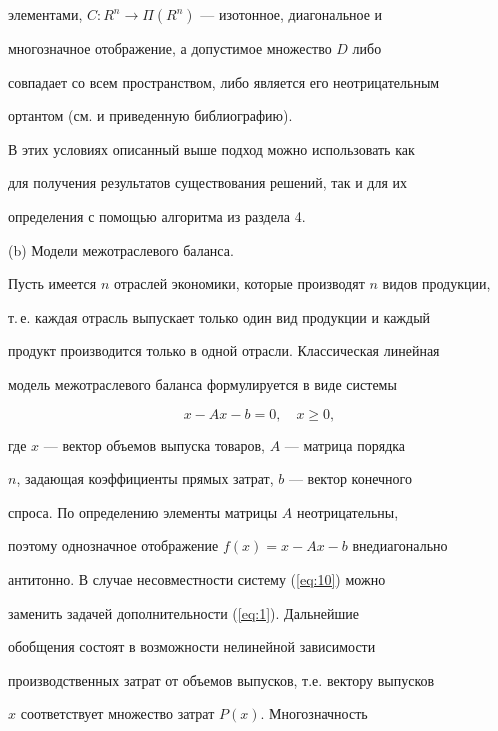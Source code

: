 элементами, $C: R^n \to \Pi (R^n)$ --- изотонное, диагональное и


многозначное отображение, а допустимое множество $D$ либо


совпадает со всем пространством, либо является его неотрицательным


ортантом (см. \cite{Lap99} и приведенную библиографию). 


В этих условиях описанный выше подход можно использовать как


для получения результатов существования решений, так и для их


определения с помощью алгоритма из раздела 4.


\medskip





(b) Модели межотраслевого баланса.





Пусть имеется $n$ отраслей экономики, которые производят $n$ видов продукции,


т.\,е. каждая отрасль выпускает только один вид продукции и каждый


продукт производится только в одной отрасли. Классическая линейная


модель межотраслевого баланса формулируется в виде системы


\begin{equation}\label{eq:10}


x-Ax-b=0,\quad x \geq 0,


\end{equation}


где $x$ --- вектор объемов выпуска товаров, $A$ --- матрица порядка


$n$, задающая коэффициенты прямых затрат, $b$ --- вектор конечного


спроса. По определению  элементы матрицы $A$ неотрицательны,


поэтому однозначное отображение $f(x)=x-Ax-b$ внедиагонально


антитонно. В случае несовместности систему (\ref{eq:10}) можно


заменить задачей дополнительности (\ref{eq:1}). Дальнейшие


обобщения состоят в возможности нелинейной зависимости


производственных затрат от объемов выпусков, т.е. вектору выпусков


$x$ соответствует множество затрат $P(x)$. Многозначность


